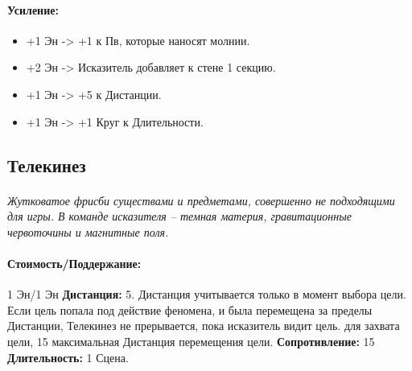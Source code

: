 \begin{itemize}
\begin{itemize}
\paragraph{Усиление:}
\begin{itemize}
\item+1 Эн -> +1 к Пв, которые наносят молнии.
\item+2 Эн -> Исказитель добавляет к стене 1 секцию.
\item+1 Эн -> +5 к Дистанции.
\item+1 Эн -> +1 Круг к Длительности.
\end{itemize}
\subsection{Телекинез}
\paragraph{} 
\textit{
\tbd Жутковатое фрисби существами и предметами, совершенно не подходящими для игры. В команде исказителя – темная материя, гравитационные червоточины и магнитные поля.}
\paragraph{Стоимость/Поддержание: }1 Эн/1 Эн
\newline
\textbf{Дистанция: }5. Дистанция учитывается только в момент выбора цели. Если цель попала под действие феномена, и была перемещена за пределы Дистанции, Телекинез не прерывается, пока исказитель видит цель. 
\newline 
{} для захвата цели, 15 максимальная Дистанция перемещения цели.
\newline
\textbf{Сопротивление: }15
\newline 
\textbf{Длительность: }1 Сцена.

\end{itemize}
\end{itemize}

